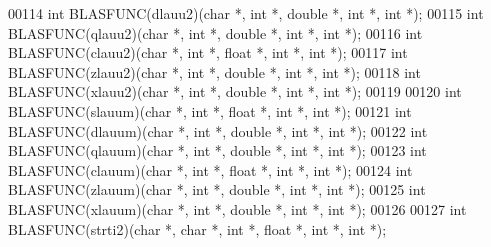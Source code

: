 \begin{DoxyCode}
00114 \textcolor{keywordtype}{int} BLASFUNC(dlauu2)(\textcolor{keywordtype}{char} *, \textcolor{keywordtype}{int} *, \textcolor{keywordtype}{double} *, \textcolor{keywordtype}{int} *, \textcolor{keywordtype}{int} *);
00115 \textcolor{keywordtype}{int} BLASFUNC(qlauu2)(\textcolor{keywordtype}{char} *, \textcolor{keywordtype}{int} *, \textcolor{keywordtype}{double} *, \textcolor{keywordtype}{int} *, \textcolor{keywordtype}{int} *);
00116 \textcolor{keywordtype}{int} BLASFUNC(clauu2)(\textcolor{keywordtype}{char} *, \textcolor{keywordtype}{int} *, \textcolor{keywordtype}{float}  *, \textcolor{keywordtype}{int} *, \textcolor{keywordtype}{int} *);
00117 \textcolor{keywordtype}{int} BLASFUNC(zlauu2)(\textcolor{keywordtype}{char} *, \textcolor{keywordtype}{int} *, \textcolor{keywordtype}{double} *, \textcolor{keywordtype}{int} *, \textcolor{keywordtype}{int} *);
00118 \textcolor{keywordtype}{int} BLASFUNC(xlauu2)(\textcolor{keywordtype}{char} *, \textcolor{keywordtype}{int} *, \textcolor{keywordtype}{double} *, \textcolor{keywordtype}{int} *, \textcolor{keywordtype}{int} *);
00119 
00120 \textcolor{keywordtype}{int} BLASFUNC(slauum)(\textcolor{keywordtype}{char} *, \textcolor{keywordtype}{int} *, \textcolor{keywordtype}{float}  *, \textcolor{keywordtype}{int} *, \textcolor{keywordtype}{int} *);
00121 \textcolor{keywordtype}{int} BLASFUNC(dlauum)(\textcolor{keywordtype}{char} *, \textcolor{keywordtype}{int} *, \textcolor{keywordtype}{double} *, \textcolor{keywordtype}{int} *, \textcolor{keywordtype}{int} *);
00122 \textcolor{keywordtype}{int} BLASFUNC(qlauum)(\textcolor{keywordtype}{char} *, \textcolor{keywordtype}{int} *, \textcolor{keywordtype}{double} *, \textcolor{keywordtype}{int} *, \textcolor{keywordtype}{int} *);
00123 \textcolor{keywordtype}{int} BLASFUNC(clauum)(\textcolor{keywordtype}{char} *, \textcolor{keywordtype}{int} *, \textcolor{keywordtype}{float}  *, \textcolor{keywordtype}{int} *, \textcolor{keywordtype}{int} *);
00124 \textcolor{keywordtype}{int} BLASFUNC(zlauum)(\textcolor{keywordtype}{char} *, \textcolor{keywordtype}{int} *, \textcolor{keywordtype}{double} *, \textcolor{keywordtype}{int} *, \textcolor{keywordtype}{int} *);
00125 \textcolor{keywordtype}{int} BLASFUNC(xlauum)(\textcolor{keywordtype}{char} *, \textcolor{keywordtype}{int} *, \textcolor{keywordtype}{double} *, \textcolor{keywordtype}{int} *, \textcolor{keywordtype}{int} *);
00126 
00127 \textcolor{keywordtype}{int} BLASFUNC(strti2)(\textcolor{keywordtype}{char} *, \textcolor{keywordtype}{char} *, \textcolor{keywordtype}{int} *, \textcolor{keywordtype}{float}  *, \textcolor{keywordtype}{int} *, \textcolor{keywordtype}{int} *);

\end{DoxyCode}
